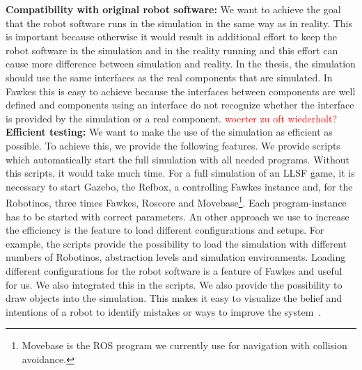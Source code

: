 \textbf{Compatibility with original robot software:} We want to achieve the goal that the robot software runs in the simulation in the same way as in reality. This is important because otherwise it would result in additional effort to keep the robot software in the simulation and in the reality running and this effort can cause more difference between simulation and reality. In the thesis, the simulation should use the same interfaces as the real components that are simulated. In Fawkes this is easy to achieve because the interfaces between components are well defined and components using an interface do not recognize whether the interface is provided by the simulation or a real component. \textcolor{red}{woerter zu oft wiederholt?}\\
\textbf{Efficient testing:} We want to make the use of the simulation as efficient as possible. To achieve this, we provide the following features. We provide scripts which automatically start the full simulation with all needed programs. Without this scripts, it would take much time. For a full simulation of an LLSF game, it is necessary to start Gazebo, the Refbox, a controlling Fawkes instance and, for the Robotinos, three times Fawkes, Roscore and Movebase\footnote{Movebase is the ROS program we currently use for navigation with collision avoidance.}. Each program-instance has to be started with correct parameters.  An other approach we use to increase the efficiency is the feature to load different configurations and setups. For example, the scripts provide the possibility to load the simulation with different numbers of Robotinos, abstraction levels and simulation environments. Loading different configurations for the robot software is a feature of Fawkes and useful for us. We also integrated this in the scripts. We also provide the possibility to draw objects into the simulation. This makes it easy to visualize the belief and intentions of a robot to identify mistakes or ways to improve the system~\cite{Visualization}.\\
